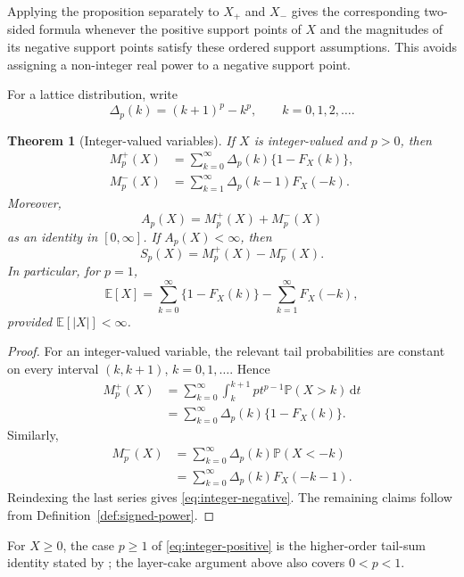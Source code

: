 \documentclass[11pt]{article}
\newtheorem{theorem}{Theorem}[section]
\theoremstyle{definition}
\theoremstyle{remark}
\newcommand{\E}{\mathbb{E}}
\newcommand{\Pp}{\mathbb{P}}
\newcommand{\dd}{\,\mathrm{d}}
\newcommand{\abs}[1]{\left\lvert #1\right\rvert}
\begin{document}
Applying the proposition separately to $X_+$ and $X_-$ gives the
corresponding two-sided formula whenever the positive support points of
$X$ and the magnitudes of its negative support points satisfy these ordered
support assumptions.  This avoids assigning a non-integer real power to a
negative support point.

For a lattice distribution, write
\[
  \Delta_p(k)=(k+1)^p-k^p,
  \qquad k=0,1,2,\ldots.
\]

\begin{theorem}[Integer-valued variables]\label{thm:integer}
If $X$ is integer-valued and $p>0$, then
\begin{align}
  M_p^+(X)
  &=\sum_{k=0}^\infty \Delta_p(k)\{1-F_X(k)\},
  \label{eq:integer-positive}\\
  M_p^-(X)
  &=\sum_{k=1}^\infty \Delta_p(k-1)F_X(-k).
  \label{eq:integer-negative}
\end{align}
Moreover,
\[
  A_p(X)=M_p^+(X)+M_p^-(X)
\]
as an identity in $[0,\infty]$.  If $A_p(X)<\infty$, then
\[
  S_p(X)=M_p^+(X)-M_p^-(X).
\]
In particular, for $p=1$,
\begin{equation}\label{eq:integer-mean}
  \E[X]
  =\sum_{k=0}^\infty\{1-F_X(k)\}
   -\sum_{k=1}^\infty F_X(-k),
\end{equation}
provided $\E[\abs X]<\infty$.
\end{theorem}

\begin{proof}
For an integer-valued variable, the relevant tail probabilities are constant
on every interval $(k,k+1)$, $k=0,1,\ldots$.  Hence
\begin{align*}
  M_p^+(X)
  &=\sum_{k=0}^\infty
    \int_k^{k+1}p t^{p-1}\Pp(X>k)\dd t\\
  &=\sum_{k=0}^\infty\Delta_p(k)\{1-F_X(k)\}.
\end{align*}
Similarly,
\begin{align*}
  M_p^-(X)
  &=\sum_{k=0}^\infty
    \Delta_p(k)\Pp(X<-k)\\
  &=\sum_{k=0}^\infty\Delta_p(k)F_X(-k-1).
\end{align*}
Reindexing the last series gives \eqref{eq:integer-negative}.  The remaining
claims follow from Definition~\ref{def:signed-power}.
\end{proof}

For $X\geq0$, the case $p\geq1$ of \eqref{eq:integer-positive} is the
higher-order tail-sum identity stated by \citet{Chakraborti2019}; the
layer-cake argument above also covers $0<p<1$.
\end{document}
